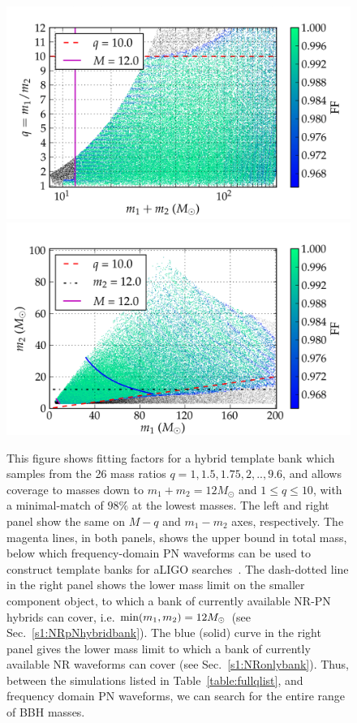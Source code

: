 \begin{figure}
\begin{center}
\includegraphics[width=\columnwidth]{bank_seperate_q1-4-35-4-65-9-6_01_mtot200_match-tiny.png}
\includegraphics[width=\columnwidth]{bank_seperate_q1-4-35-4-65-9-6_01_m1m2200_match-tiny.png}
\caption{\label{fig:templatebank_halfMassRatios}This figure shows
  fitting factors for a hybrid template bank which samples from the 26 mass
  ratios $q=1,1.5,1.75,2,..,9.6$, and allows coverage to masses down to 
  $m_1 + m_2 = 12M_{\odot}$ and $1\leq q\leq 10$, with a minimal-match of $98\%$
  at the lowest masses. 
  The left and right panel show the same on $M-q$ and $m_1-m_2$ axes, 
  respectively. The magenta lines, in both panels, shows the upper bound 
  in total mass, below which frequency-domain PN waveforms can be used to construct template banks for aLIGO
  searches~\cite{CompTemplates2009,Brown:2012nn}. The dash-dotted line
  in the right panel shows the lower mass limit on the smaller component object,
  to which a bank of currently available NR-PN hybrids can cover, i.e.
  $\mathrm{min}(m_1,m_2)=12M_\odot$ (see Sec.~\ref{s1:NRpNhybridbank}). The blue (solid)
  curve in  the right panel gives the lower mass limit to which a bank of
  currently available NR waveforms can cover (see Sec.~\ref{s1:NRonlybank}).
  Thus, between the simulations listed in Table~\ref{table:fullqlist}, 
  and frequency domain PN waveforms, we can search for the entire range of 
  BBH masses.}
\end{center}
\end{figure}
